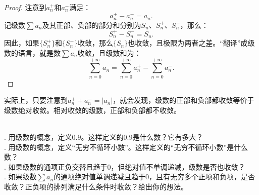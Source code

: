 \documentclass[12pt,UTF8]{ctexbook}
\begin{document}
\begin{proof}
    注意到$a_n^+$和$a_n^-$满足：
    $$ a_n^+ - a_n^- = a_n. $$
    记级数$\sum a_n$及其正部、负部的部分和分别为$S_n$、$S_n^+$、$S_n^-$，那么：
    $$ S_n^+ - S_n^- = S_n. $$
    因此，如果$\{S_n^+\}$和$\{S_n^-\}$收敛，那么$\{S_n\}$也收敛，且极限为两者之差。“翻译”成级数的语言，就是数$\sum a_n$收敛，且级数和为：
    $$\sum_{n=0}^{+\infty} a_n = \sum_{n=0}^{+\infty} a_n^+ - \sum_{n=0}^{+\infty} a_n^-.$$ 
\end{proof}

实际上，只要注意到$ a_n^+ + a_n^- = |a_n|$，就会发现，级数的正部和负部都收敛等价于级数绝对收敛。相对收敛的级数，正部和负部都不收敛。

\begin{sk}
    \mbox{} \\
    . 用级数的概念，定义$0.\dot{9}$。这样定义的$0.\dot{9}$是什么数？它有多大？\\
    . 用级数的概念，定义“无穷不循环小数”。这样定义的“无穷不循环小数”是什么数？\\
    . 如果级数的通项正负交替且趋于$0$，但绝对值不单调递减，级数是否也收敛？\\
    . 如果级数$\sum a_n$的通项绝对值单调递减且趋于$0$，且有无穷多个正项和负项，是否收敛？正负项的排列满足什么条件时收敛？给出你的想法。
    
\end{sk}
\end{document}
